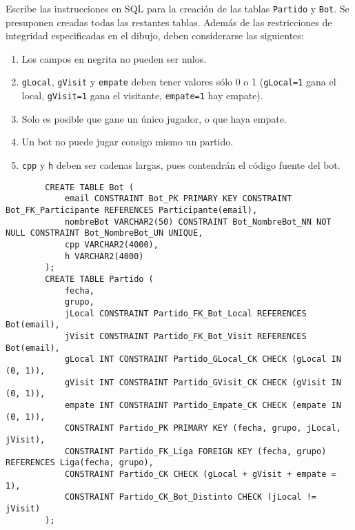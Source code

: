 \documentclass[12pt]{article}
\begin{document}
\begin{ejercicio}
    Escribe las instrucciones en SQL para la creación de las tablas \verb|Partido| y \verb|Bot|. Se presuponen creadas todas las restantes tablas. Además de las restricciones de integridad especificadas en el dibujo, deben considerarse las siguientes:
    \begin{enumerate}
        \item Los campos en negrita no pueden ser nulos.
        \item \verb|gLocal|, \verb|gVisit| y \verb|empate| deben tener valores sólo 0 o 1 (\verb|gLocal=1| gana el local, \verb|gVisit=1| gana el visitante, \verb|empate=1| hay empate).
        \item Solo es posible que gane un único jugador, o que haya empate.
        \item Un bot no puede jugar consigo mismo un partido.
        \item \verb|cpp| y \verb|h| deben ser cadenas largas, pues contendrán el código fuente del bot.
    \end{enumerate}

    \begin{verbatim}
        CREATE TABLE Bot (
            email CONSTRAINT Bot_PK PRIMARY KEY CONSTRAINT Bot_FK_Participante REFERENCES Participante(email),
            nombreBot VARCHAR2(50) CONSTRAINT Bot_NombreBot_NN NOT NULL CONSTRAINT Bot_NombreBot_UN UNIQUE,
            cpp VARCHAR2(4000),
            h VARCHAR2(4000)
        );
        CREATE TABLE Partido (
            fecha,
            grupo,
            jLocal CONSTRAINT Partido_FK_Bot_Local REFERENCES Bot(email),
            jVisit CONSTRAINT Partido_FK_Bot_Visit REFERENCES Bot(email),
            gLocal INT CONSTRAINT Partido_GLocal_CK CHECK (gLocal IN (0, 1)),
            gVisit INT CONSTRAINT Partido_GVisit_CK CHECK (gVisit IN (0, 1)),
            empate INT CONSTRAINT Partido_Empate_CK CHECK (empate IN (0, 1)),
            CONSTRAINT Partido_PK PRIMARY KEY (fecha, grupo, jLocal, jVisit),
            CONSTRAINT Partido_FK_Liga FOREIGN KEY (fecha, grupo) REFERENCES Liga(fecha, grupo),
            CONSTRAINT Partido_CK CHECK (gLocal + gVisit + empate = 1),
            CONSTRAINT Partido_CK_Bot_Distinto CHECK (jLocal != jVisit)
        );
    \end{verbatim}
\end{ejercicio}
\end{document}
